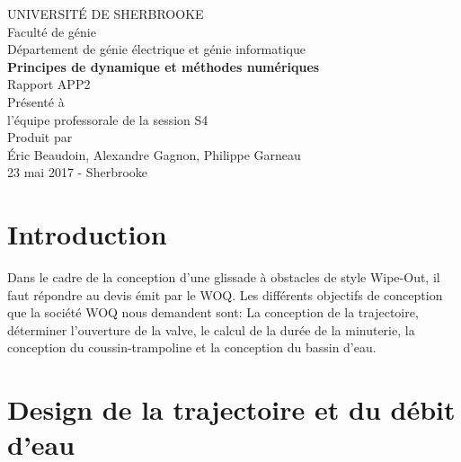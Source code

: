\documentclass{article}
\begin{document}
\begin{titlepage}   
	\large{
		\begin{center}
			UNIVERSITÉ DE SHERBROOKE\\Faculté de génie\\
			Département de génie électrique et génie informatique\\
			\vspace{3cm}
			{\LARGE\textbf{Principes de dynamique et méthodes numériques}}\\
			\vspace{2cm}
			\LARGE{Rapport APP2}\\
			\vspace{2cm}
			Présenté à\\l'équipe professorale de la session S4\\
			\vspace{2cm}
			Produit par\\Éric Beaudoin, Alexandre Gagnon, Philippe Garneau\\
			\vspace{1cm}
			\vfill{23 mai 2017 - Sherbrooke}
		\end{center}
	}
\end{titlepage}
\newpage
\tableofcontents

\newpage
\section{Introduction}
Dans le cadre de la conception d'une glissade à obstacles de style Wipe-Out, il faut répondre au devis émit par le WOQ. Les différents objectifs de conception que la société WOQ nous demandent sont: La conception de la trajectoire, déterminer l'ouverture de la valve, le calcul de la durée de la minuterie, la conception du coussin-trampoline et la conception du bassin d'eau. 

\section{Design de la trajectoire et du débit d'eau}
\end{document}
